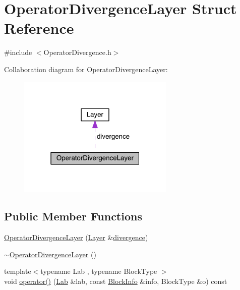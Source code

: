 \hypertarget{struct_operator_divergence_layer}{}\section{Operator\+Divergence\+Layer Struct Reference}
\label{struct_operator_divergence_layer}


{\ttfamily \#include $<$Operator\+Divergence.\+h$>$}



Collaboration diagram for Operator\+Divergence\+Layer\+:\nopagebreak
\begin{figure}[H]
\begin{center}
\leavevmode
\includegraphics[width=211pt]{d5/d64/struct_operator_divergence_layer__coll__graph}
\end{center}
\end{figure}
\subsection*{Public Member Functions}
\begin{DoxyCompactItemize}
\item 
\hyperlink{struct_operator_divergence_layer_abae01528fbc5323cfeab708f5942fc0c}{Operator\+Divergence\+Layer} (\hyperlink{struct_layer}{Layer} \&\hyperlink{struct_operator_divergence_layer_ad330cbeb8c609a3bd92639c50a4cc7b1}{divergence})
\item 
\hyperlink{struct_operator_divergence_layer_ab879de5dd496c4f07b8c6c2c632050f2}{$\sim$\+Operator\+Divergence\+Layer} ()
\item 
{\footnotesize template$<$typename Lab , typename Block\+Type $>$ }\\void \hyperlink{struct_operator_divergence_layer_a764c3ca9116897888c989ff440460e04}{operator()} (\hyperlink{_definitions_8h_ad6f951af9a2a6ebc1975404882b34314}{Lab} \&lab, const \hyperlink{struct_block_info}{Block\+Info} \&info, Block\+Type \&o) const 
\end{DoxyCompactItemize}
